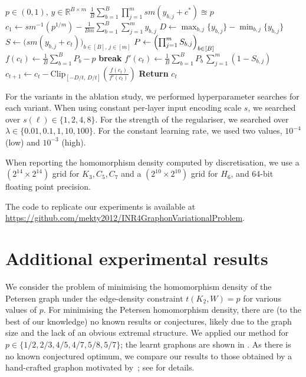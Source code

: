 \documentclass[11pt]{article}
\theoremstyle{plain}
\theoremstyle{definition}
\theoremstyle{remark}
\newcommand*{\R}{\mathbb{R}}
\begin{document}
\begin{algorithm}
  \caption{Homomorphism-Density Constraint Solver}\label{alg:cap-hom}
  \begin{algorithmic}
    \REQUIRE $p \in (0,1)$, $y \in \R^{B \times m}$
    \ENSURE $\frac{1}{B} \sum_{b=1}^B \prod_{j=1}^m \mathit{sm}(y_{b,j} + c^*) \approxeq p$
    \STATE $c_1 \gets \mathit{sm}^{-1}(p^{1/m}) - \frac{1}{Bm} \sum_{b=1}^B \sum_{j=1}^m y_{b,j}$ \hfill {}
    \STATE $D \gets \max_{b,j}\{y_{b,j}\} - \min_{b,j}\{y_{b,j}\}$ \hfill {}
      \STATE $S \gets \bigl(\mathit{sm}(y_{b,j} + c_t)\bigr)_{b \in [B],\, j \in [m]}$
      \STATE $P \gets \Bigl(\prod_{j=1}^m S_{b,j}\Bigr)_{b \in [B]}$
      \STATE $f(c_t) \gets \frac{1}{B} \sum_{b=1}^B P_b - p$
        \STATE \textbf{break}
      \ENDIF
      \STATE $f'(c_t) \gets \frac{1}{B} \sum_{b=1}^B P_b\,\sum_{j=1}^m (1 - S_{b,j})$
      \STATE $c_{t+1} \gets c_t - \mathrm{Clip}_{[-D/t,\, D/t]}\left(\frac{f(c_t)}{f'(c_t)}\right)$
    \ENDFOR
    \STATE \textbf{Return} $c_t$
  \end{algorithmic}
\end{algorithm}

For the variants in the ablation study, we performed hyperparameter searches for each variant.
When using constant per-layer input encoding scale $s$, we searched over $s(\ell) \in \{1, 2, 4, 8\}$.
For the strength of the regulariser, we searched over $\lambda \in \{0.01, 0.1, 1, 10, 100\}$.
For the constant learning rate, we used two values, $10^{-4}$ (low) and $10^{-3}$ (high).

When reporting the homomorphism density computed by discretisation, we use a $(2^{14} \times 2^{14})$ grid for $K_3, C_5, C_7$ and a $(2^{10} \times 2^{10})$ grid for $H_6$, and 64-bit floating point precision.

The code to replicate our experiments is available at \url{https://github.com/mekty2012/INR4GraphonVariationalProblem}.

\section{Additional experimental results}
\label{sec:addexperiments}

We consider the problem of minimising the homomorphism density of the Petersen graph under the edge-density constraint $t(K_2, W) = p$ for various values of $p$.
For minimising the Petersen homomorphism density, there are (to the best of our knowledge) no known results or conjectures, likely due to the graph size and the lack of an obvious extremal structure.
We applied our method for $p \in \{1/2, 2/3, 4/5, 4/7, 5/8, 5/7\}$; the learnt graphons are shown in .
As there is no known conjectured optimum, we compare our results to those obtained by a hand-crafted graphon motivated by~\citet{razborov2008minimal}; see  for details.
\end{document}
